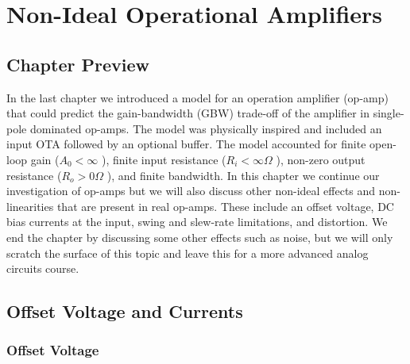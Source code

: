 

\graphicspath{{./figs_opamp_real/}}





\chapter{Non-Ideal Operational Amplifiers}





\section{Chapter Preview}

In the last chapter we introduced a model for an operation amplifier (op-amp) that could predict the gain-bandwidth (GBW) trade-off of the amplifier in single-pole dominated op-amps.  The model was physically inspired and included an input OTA followed by an optional buffer.   The model accounted for finite open-loop gain ($A_0 < \infty$ ), finite input resistance ($R_i < \infty\Omega$ ), non-zero output resistance ($R_o > 0\Omega$ ), and finite bandwidth.  In this chapter we continue our investigation of op-amps but we will also discuss other non-ideal effects and non-linearities that are present in real op-amps.  These include an offset voltage, DC bias currents at the input, swing and slew-rate limitations, and distortion.  We end the chapter by discussing some other effects such as noise, but we will only scratch the surface of this topic and leave this for a more advanced analog circuits course.
 

\section{Offset Voltage and Currents}


\subsection{Offset Voltage}



